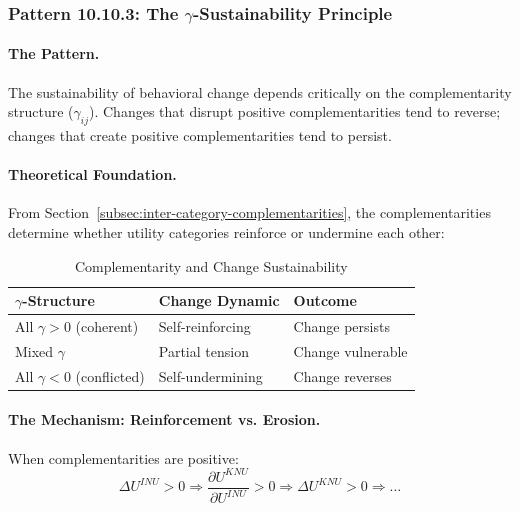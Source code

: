 \subsubsection{Pattern 10.10.3: The $\gamma$-Sustainability Principle}
\label{subsubsec:gamma-sustainability}

\paragraph{The Pattern.}
The sustainability of behavioral change depends critically on the 
complementarity structure ($\gamma_{ij}$). Changes that disrupt positive 
complementarities tend to reverse; changes that create positive 
complementarities tend to persist.

\paragraph{Theoretical Foundation.}
From Section~\ref{subsec:inter-category-complementarities}, the complementarities 
determine whether utility categories reinforce or undermine each other:

\begin{table}[htbp]
\centering
\caption{Complementarity and Change Sustainability}
\label{tab:gamma-sustainability}
\renewcommand{\arraystretch}{1.3}
\begin{tabular}{@{}lll@{}}
\toprule
\textbf{$\gamma$-Structure} & \textbf{Change Dynamic} & \textbf{Outcome} \\
\midrule
All $\gamma > 0$ (coherent) & Self-reinforcing & Change persists \\
Mixed $\gamma$ & Partial tension & Change vulnerable \\
All $\gamma < 0$ (conflicted) & Self-undermining & Change reverses \\
\bottomrule
\end{tabular}
\end{table}

\paragraph{The Mechanism: Reinforcement vs. Erosion.}
When complementarities are positive:
\begin{equation}
\Delta U^{INU} > 0 \Rightarrow \frac{\partial U^{KNU}}{\partial U^{INU}} > 0 \Rightarrow \Delta U^{KNU} > 0 \Rightarrow \ldots
\end{equation}

